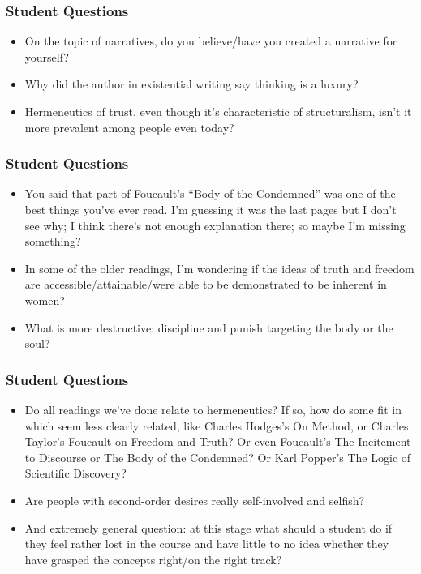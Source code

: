 \documentclass[xcolor=dvipsnames]{beamer}
\begin{document}
\begin{frame}
  \frametitle{Student Questions}
  \begin{itemize}
  \item On the topic of narratives, do you believe/have you created a
    narrative for yourself?
  \item Why did the author in existential writing say thinking is a
    luxury?
  \item Hermeneutics of trust, even though it's characteristic of
    structuralism, isn't it more prevalent among people even today?
  \end{itemize}
\end{frame}

\begin{frame}
  \frametitle{Student Questions}
  \begin{itemize}
  \item You said that part of Foucault's ``Body of the Condemned'' was
    one of the best things you've ever read. I'm guessing it was the
    last pages but I don't see why; I think there's not enough
    explanation there; so maybe I'm missing something?
  \item In some of the older readings, I'm wondering if the ideas of
    truth and freedom are accessible/attainable/were able to be
    demonstrated to be inherent in women?
  \item What is more destructive: discipline and punish targeting the
    body or the soul?
  \end{itemize}
\end{frame}

\begin{frame}
  \frametitle{Student Questions}
  \begin{itemize}
  \item Do all readings we've done relate to hermeneutics? If so, how
    do some fit in which seem less clearly related, like Charles
    Hodges's On Method, or Charles Taylor's Foucault on Freedom and
    Truth? Or even Foucault's The Incitement to Discourse or The Body
    of the Condemned? Or Karl Popper's The Logic of Scientific
    Discovery?
  \item Are people with second-order desires really self-involved and
    selfish?
  \item And extremely general question: at this stage what should a
    student do if they feel rather lost in the course and have little
    to no idea whether they have grasped the concepts right/on the
    right track?
  \end{itemize}
\end{frame}
\end{document}
